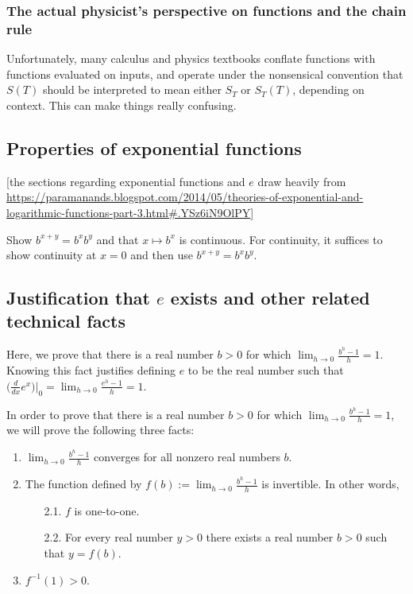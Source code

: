 \documentclass{article}
\begin{document}
\subsubsection*{The actual physicist's perspective on functions and the chain rule}

Unfortunately, many calculus and physics textbooks conflate functions with functions evaluated on inputs, and operate under the nonsensical convention that $S(T)$ should be interpreted to mean either $S_T$ or $S_T(T)$, depending on context. This can make things really confusing.

\subsection*{Properties of exponential functions}

[the sections regarding exponential functions and $e$ draw heavily from \url{https://paramanands.blogspot.com/2014/05/theories-of-exponential-and-logarithmic-functions-part-3.html#.YSz6iN9OlPY}]

Show $b^{x + y} = b^x b^y$ and that $x \mapsto b^x$ is continuous. For continuity, it suffices to show continuity at $x = 0$ and then use $b^{x + y} = b^x b^y$.

\subsection*{Justification that $e$ exists and other related technical facts}

Here, we prove that there is a real number $b > 0$ for which $\lim_{h \rightarrow 0} \frac{b^h - 1}{h} = 1$. Knowing this fact justifies defining $e$ to be the real number such that ${\Big( \frac{d}{dx} e^x \Big)\Big|_0 = \lim_{h \rightarrow 0} \frac{e^h - 1}{h} = 1}$.

In order to prove that there is a real number $b > 0$ for which $\lim_{h \rightarrow 0} \frac{b^h - 1}{h} = 1$, we will prove the following three facts:

\begin{enumerate}
    \item $\lim_{h \rightarrow 0} \frac{b^h - 1}{h}$ converges for all nonzero real numbers $b$.
    \item The function defined by $f(b) := \lim_{h \rightarrow 0} \frac{b^h - 1}{h}$ is invertible. In other words, 
    \begin{enumerate}
        \item[2.1.] $f$ is one-to-one.
        \item[2.2.] For every real number $y > 0$ there exists a real number $b > 0$ such that $y = f(b)$.
    \end{enumerate}
    \item $f^{-1}(1) > 0$.
\end{enumerate}
\end{document}
